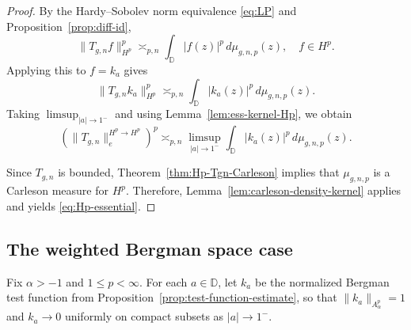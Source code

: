 \documentclass[preprint,12pt]{elsarticle}
\numberwithin{equation}{section}
\theoremstyle{remark}
\begin{document}
\begin{proof}
By the Hardy--Sobolev norm equivalence \eqref{eq:LP} and Proposition~\ref{prop:diff-id},
\begin{equation*}
\|T_{g,n}f\|_{H^p}^p\asymp_{p,n}\int_{\mathbb D}|f(z)|^p\,d\mu_{g,n,p}(z),\quad f\in H^p.
\end{equation*}
Applying this to $f=k_a$ gives
\begin{equation*}
\|T_{g,n}k_a\|_{H^p}^p\asymp_{p,n}\int_{\mathbb D}|k_a(z)|^p\,d\mu_{g,n,p}(z).
\end{equation*}
Taking $\limsup_{|a|\to 1^-}$ and using Lemma~\ref{lem:ess-kernel-Hp}, we obtain
\begin{equation*}
\left(\|T_{g,n}\|_{e}^{H^p\to H^p}\right)^p\asymp_{p,n}
\limsup_{|a|\to 1^-}\int_{\mathbb D}|k_a(z)|^p\,d\mu_{g,n,p}(z).
\end{equation*}

Since $T_{g,n}$ is bounded, Theorem~\ref{thm:Hp-Tgn-Carleson} implies that $\mu_{g,n,p}$ is a Carleson measure for $H^p$. Therefore, Lemma~\ref{lem:carleson-density-kernel} applies and yields
\eqref{eq:Hp-essential}.
\end{proof}

\subsection{The weighted Bergman space case}\label{subsec:essential-Bergman}

Fix $\alpha>-1$ and $1\le p<\infty$. For each $a\in\mathbb D$, let $k_a$ be the normalized
Bergman test function from Proposition~\ref{prop:test-function-estimate}, so that
$\|k_a\|_{A_\alpha^p}=1$ and $k_a\to 0$ uniformly on compact subsets as $|a|\to 1^-$.
\end{document}
